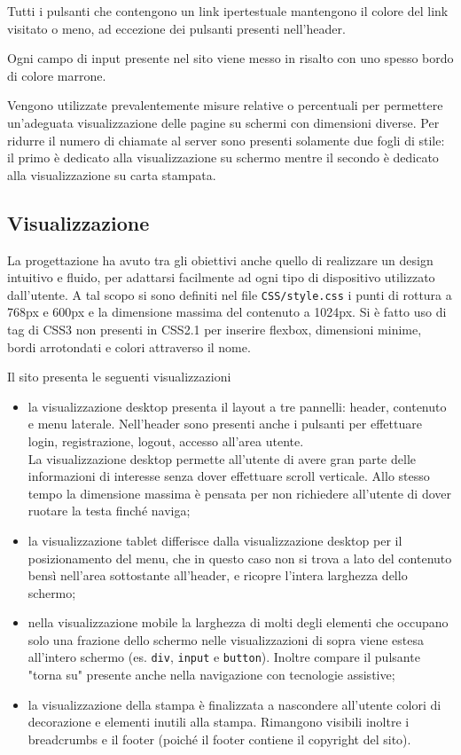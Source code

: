 \documentclass[12pt,a4paper,headings=optiontohead]{article}
\begin{document}
Tutti i pulsanti che contengono un link ipertestuale mantengono il colore del link visitato o meno, ad eccezione dei pulsanti presenti nell'header.

Ogni campo di input presente nel sito viene messo in risalto con uno spesso bordo di colore marrone.

Vengono utilizzate prevalentemente misure relative o percentuali per permettere un'adeguata visualizzazione delle pagine su schermi con dimensioni diverse.
Per ridurre il numero di chiamate al server sono presenti solamente due fogli di stile: il primo è dedicato alla visualizzazione su schermo mentre il secondo è dedicato alla visualizzazione su carta stampata.

\subsection{Visualizzazione}
La progettazione ha avuto tra gli obiettivi anche quello di realizzare un design intuitivo e fluido, per adattarsi facilmente ad ogni tipo di dispositivo utilizzato dall'utente.
A tal scopo si sono definiti nel file \texttt{CSS/style.css} i punti di rottura a 768px e 600px e la dimensione massima del contenuto a 1024px.
Si è fatto uso di tag di CSS3 non presenti in CSS2.1 per inserire flexbox, dimensioni minime, bordi arrotondati e colori attraverso il nome.

Il sito presenta le seguenti visualizzazioni
\begin{itemize}
\item la visualizzazione desktop presenta il layout a tre pannelli: header, contenuto e menu laterale. Nell'header sono presenti anche i pulsanti per effettuare login, registrazione, logout, accesso all'area utente.\\
La visualizzazione desktop permette all'utente di avere gran parte delle informazioni di interesse senza dover effettuare scroll verticale. Allo stesso tempo la dimensione massima è pensata per non richiedere all'utente di dover ruotare la testa finché naviga;
\item la visualizzazione tablet differisce dalla visualizzazione desktop per il posizionamento del menu, che in questo caso non si trova a lato del contenuto bensì nell'area sottostante all'header, e ricopre l'intera larghezza dello schermo;
\item nella visualizzazione mobile la larghezza di molti degli elementi che occupano solo una frazione dello schermo nelle visualizzazioni di sopra viene estesa all'intero schermo (es. \texttt{div}, \texttt{input} e \texttt{button}). Inoltre compare il pulsante "torna su" presente anche nella navigazione con tecnologie assistive;
\item la visualizzazione della stampa è finalizzata a nascondere all'utente colori di decorazione e elementi inutili alla stampa. Rimangono visibili inoltre i breadcrumbs e il footer (poiché il footer contiene il copyright del sito).
\end{itemize}
\end{document}
